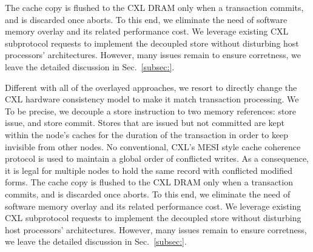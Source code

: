 The cache copy is flushed to the CXL DRAM only when a transaction commits, and is discarded once aborts. 
To this end, we eliminate the need of software memory overlay and its related performance cost. 
We leverage existing CXL subprotocol requests to implement the decoupled store without disturbing host processors' architectures. 
However, many issues remain to ensure corretness, we leave the detailed discussion in Sec.~\ref{subsec:}. 


Different with all of the overlayed approaches, we resort to directly change the CXL hardware consistency model to make it match transaction processing. We 
To be precise, we decouple a store instruction to two memory references: store issue, and store commit. 
Stores that are issued but not committed are kept within the node's caches for the duration of the transaction in order to keep invisible from other nodes. 
No conventional, CXL's MESI style cache coherence protocol is used to maintain a global order of conflicted writes. As a consequence, it is legal for multiple nodes to hold the same record with conflicted modified forms. 
The cache copy is flushed to the CXL DRAM only when a transaction commits, and is discarded once aborts. 
To this end, we eliminate the need of software memory overlay and its related performance cost. 
We leverage existing CXL subprotocol requests to implement the decoupled store without disturbing host processors' architectures. 
However, many issues remain to ensure corretness, we leave the detailed discussion in Sec.~\ref{subsec:}. 

\fi









